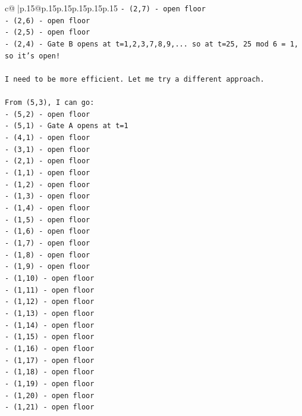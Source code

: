 \documentclass{article}
\begin{document}
{\begin{supertabular}{c@{$\;$}|p{.15\linewidth}@{}p{.15\linewidth}p{.15\linewidth}p{.15\linewidth}p{.15\linewidth}p{.15\linewidth}}
{{{\texttt{{-} (2,7) {-} open floor} \\
\texttt{{-} (2,6) {-} open floor} \\
\texttt{{-} (2,5) {-} open floor} \\
\texttt{{-} (2,4) {-} Gate B opens at t=1,2,3,7,8,9,... so at t=25, 25 mod 6 = 1, so it's open!} \\
\\ 
\texttt{I need to be more efficient. Let me try a different approach.} \\
\\ 
\texttt{From (5,3), I can go:} \\
\texttt{{-} (5,2) {-} open floor} \\
\texttt{{-} (5,1) {-} Gate A opens at t=1} \\
\texttt{{-} (4,1) {-} open floor} \\
\texttt{{-} (3,1) {-} open floor} \\
\texttt{{-} (2,1) {-} open floor} \\
\texttt{{-} (1,1) {-} open floor} \\
\texttt{{-} (1,2) {-} open floor} \\
\texttt{{-} (1,3) {-} open floor} \\
\texttt{{-} (1,4) {-} open floor} \\
\texttt{{-} (1,5) {-} open floor} \\
\texttt{{-} (1,6) {-} open floor} \\
\texttt{{-} (1,7) {-} open floor} \\
\texttt{{-} (1,8) {-} open floor} \\
\texttt{{-} (1,9) {-} open floor} \\
\texttt{{-} (1,10) {-} open floor} \\
\texttt{{-} (1,11) {-} open floor} \\
\texttt{{-} (1,12) {-} open floor} \\
\texttt{{-} (1,13) {-} open floor} \\
\texttt{{-} (1,14) {-} open floor} \\
\texttt{{-} (1,15) {-} open floor} \\
\texttt{{-} (1,16) {-} open floor} \\
\texttt{{-} (1,17) {-} open floor} \\
\texttt{{-} (1,18) {-} open floor} \\
\texttt{{-} (1,19) {-} open floor} \\
\texttt{{-} (1,20) {-} open floor} \\
\texttt{{-} (1,21) {-} open floor} \\
}}}
\end{supertabular}}
\end{document}
